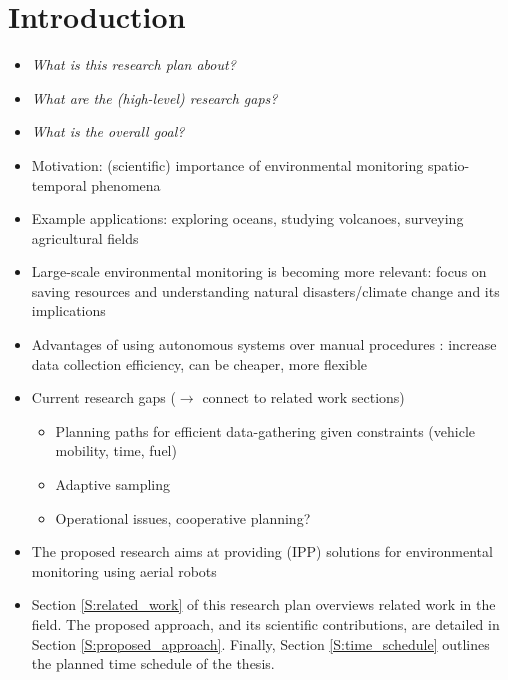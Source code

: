 \section{Introduction}
\label{S:introduction}

\begin{itemize}
  \item \emph{What is this research plan about?}
  \item \emph{What are the (high-level) research gaps?}
  \item \emph{What is the overall goal?}
\end{itemize}

\hrulefill

\begin{itemize}
 
 \item Motivation: (scientific) importance of environmental monitoring spatio-temporal phenomena 
\cite{Detweiler2015, Hitz2015}
 \item Example applications: exploring oceans, studying volcanoes, surveying agricultural fields
 \item Large-scale environmental monitoring is becoming more relevant: focus on saving resources and 
understanding natural disasters/climate change and its implications

 \item Advantages of using autonomous systems over manual procedures \cite{Detweiler2015}: increase data 
collection efficiency, can be cheaper, more flexible
 
 \item Current research gaps ($\rightarrow$ connect to related work sections)
 \begin{itemize}
  \item Planning paths for efficient data-gathering given constraints (vehicle mobility, time, fuel)
  \item Adaptive sampling
  \item Operational issues, cooperative planning?
 \end{itemize}

 \item The proposed research aims at providing (IPP) solutions for environmental monitoring using aerial 
robots 
 \item Section \ref{S:related_work} of this research plan overviews related work in the field. The proposed 
approach, and its scientific contributions, are detailed in Section \ref{S:proposed_approach}. Finally, 
Section \ref{S:time_schedule} outlines the planned time schedule of the thesis.
 
\end{itemize}